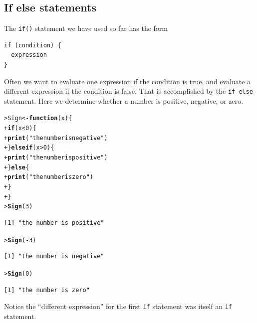 \documentclass[12pt,oneside]{book}\usepackage[]{graphicx}\usepackage[]{color}
\makeatletter
\newcommand{\hlnum}[1]{\textcolor[rgb]{0.686,0.059,0.569}{#1}}%
\newcommand{\hlstr}[1]{\textcolor[rgb]{0.192,0.494,0.8}{#1}}%
\newcommand{\hlopt}[1]{\textcolor[rgb]{0,0,0}{#1}}%
\newcommand{\hlstd}[1]{\textcolor[rgb]{0.345,0.345,0.345}{#1}}%
\newcommand{\hlkwa}[1]{\textcolor[rgb]{0.161,0.373,0.58}{\textbf{#1}}}%
\newcommand{\hlkwb}[1]{\textcolor[rgb]{0.69,0.353,0.396}{#1}}%
\newcommand{\hlkwc}[1]{\textcolor[rgb]{0.333,0.667,0.333}{#1}}%
\newcommand{\hlkwd}[1]{\textcolor[rgb]{0.737,0.353,0.396}{\textbf{#1}}}%
\newenvironment{kframe}{%
 \def\at@end@of@kframe{}%
 \ifinner\ifhmode%
  \def\at@end@of@kframe{\end{minipage}}%
  \begin{minipage}{\columnwidth}%
 \fi\fi%
 \def\FrameCommand##1{\hskip\@totalleftmargin \hskip-\fboxsep
 \colorbox{shadecolor}{##1}\hskip-\fboxsep
     \hskip-\linewidth \hskip-\@totalleftmargin \hskip\columnwidth}%
 \MakeFramed {\advance\hsize-\width
   \@totalleftmargin\z@ \linewidth\hsize
   \@setminipage}}%
 {\par\unskip\endMakeFramed%
 \at@end@of@kframe}
\newenvironment{knitrout}{}{} %
\makeatother
\begin{document}
\subsection{If else statements}
The \verb+if()+ statement we have used so far has the form 
\begin{verbatim}
if (condition) {
  expression
}
\end{verbatim}
Often we want to evaluate one expression if the condition is true, and evaluate a different expression if the condition is false. That is accomplished by the \verb+if else+ statement. Here we determine whether a number is positive, negative, or zero.
\begin{knitrout}
\color{fgcolor}\begin{kframe}
\begin{alltt}
\hlstd{> }\hlstd{Sign} \hlkwb{<-} \hlkwa{function}\hlstd{(}\hlkwc{x}\hlstd{) \{}
\hlstd{+ }    \hlkwa{if} \hlstd{(x} \hlopt{<} \hlnum{0}\hlstd{) \{}
\hlstd{+ }        \hlkwd{print}\hlstd{(}\hlstr{"the number is negative"}\hlstd{)}
\hlstd{+ }    \hlstd{\}} \hlkwa{else if} \hlstd{(x} \hlopt{>} \hlnum{0}\hlstd{) \{}
\hlstd{+ }        \hlkwd{print}\hlstd{(}\hlstr{"the number is positive"}\hlstd{)}
\hlstd{+ }    \hlstd{\}} \hlkwa{else} \hlstd{\{}
\hlstd{+ }        \hlkwd{print}\hlstd{(}\hlstr{"the number is zero"}\hlstd{)}
\hlstd{+ }    \hlstd{\}}
\hlstd{+ }\hlstd{\}}
\hlstd{> }\hlkwd{Sign}\hlstd{(}\hlnum{3}\hlstd{)}
\end{alltt}
\begin{verbatim}
[1] "the number is positive"
\end{verbatim}
\begin{alltt}
\hlstd{> }\hlkwd{Sign}\hlstd{(}\hlopt{-}\hlnum{3}\hlstd{)}
\end{alltt}
\begin{verbatim}
[1] "the number is negative"
\end{verbatim}
\begin{alltt}
\hlstd{> }\hlkwd{Sign}\hlstd{(}\hlnum{0}\hlstd{)}
\end{alltt}
\begin{verbatim}
[1] "the number is zero"
\end{verbatim}
\end{kframe}
\end{knitrout}
Notice the ``different expression'' for the first \verb+if+ statement was itself an \verb+if+ statement. 
\end{document}
